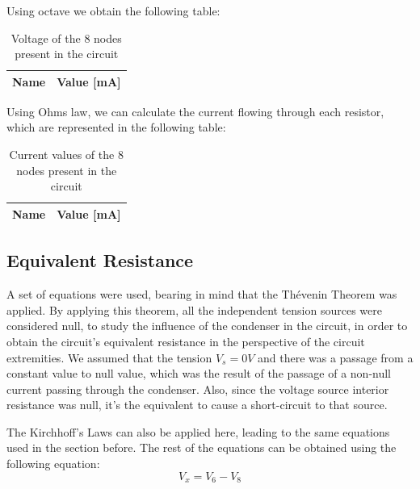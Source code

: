Using octave we obtain the following table:
\begin{table}[h!]
	\centering
	\begin{tabular}{|l|r|}
		\hline    
		{\bf Name} & {\bf Value [mA]} \\ \hline
		
	\end{tabular}
	\caption{Voltage of the 8 nodes present in the circuit}
	\label{tab:op}
\end{table}


Using Ohms law, we can calculate the current flowing through each resistor, which are represented in the following table:
 \begin{table}[h!]
 	\centering
 	\begin{tabular}{|l|r|}
 		\hline    
 		{\bf Name} & {\bf Value [mA]} \\ \hline
 		
 	\end{tabular}
 	\caption{Current values of the 8 nodes present in the circuit}
 	\label{tab:op}
 \end{table}
 

\subsection{Equivalent Resistance}
A set of equations were used, bearing in mind that the Thévenin Theorem was applied. By applying this theorem, all the independent tension sources were considered null, to study the influence of the condenser in the circuit, in order to obtain the circuit's equivalent resistance in the perspective of the circuit extremities. We assumed that the tension $V_s = 0V$ and there was a passage from a constant value to null value, which was the result of the passage of a non-null current passing through the condenser. Also, since the voltage source interior resistance was null, it's the equivalent to cause a short-circuit to that source.

The Kirchhoff's Laws can also be applied here, leading to the same equations used in the section before. The rest of the equations can be obtained using the following equation:
\begin{equation}
	V_x = V_6 - V_8
\end{equation}

